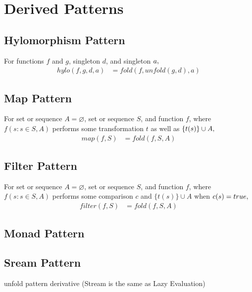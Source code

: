 \documentclass[12pt]{amsart}
\begin{document}
\section{Derived Patterns}
\subsection{Hylomorphism Pattern}
For functions $f$ and $g$, singleton $d$, and singleton $a,\\$
\begin{align*}
hylo(f,g,d,a) &= fold(f,unfold(g,d),a)
\end{align*}	
\subsection{Map Pattern}
For set or sequence $A=\varnothing$, set or sequence $S$, and function $f$, where $f(s:s\in S, A)$ performs some transformation $t$ as well as $\{t(s)\}\cup A,\\$ 
\begin{align*}
map(f,S) &= fold(f,S,A)
\end{align*}
\subsection{Filter Pattern}
For set or sequence $A=\varnothing$, set or sequence $S$, and function $f$, where $f(s:s\in S, A)$ performs some comparison $c$ and $\{t(s)\}\cup A$ when $c(s)=true,\\$
\begin{align*}
filter(f,S) &= fold(f,S,A)
\end{align*}
\subsection{Monad Pattern}

\subsection{Sream Pattern}
unfold pattern derivative (Stream is the same as Lazy Evaluation)
\end{document}
